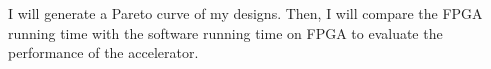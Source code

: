 \documentclass{sig-alternate}
\begin{document}
I will generate a Pareto curve of my designs. Then, I will compare the FPGA running time with the software running time on FPGA to evaluate the performance of the accelerator.

{\small
\balance
%


}





\end{document}
